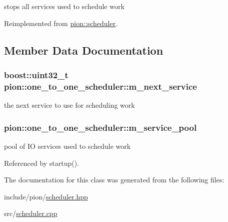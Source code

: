 stops all services used to schedule work 



Reimplemented from \hyperlink{classpion_1_1scheduler_a62b59f0561bd527d78768fd3a5ceeb36}{pion\-::scheduler}.



\subsection{Member Data Documentation}
\hypertarget{classpion_1_1one__to__one__scheduler_ae4e2b2a157c1c9e36694e86b6ae354b1}{
\subsubsection[{m\-\_\-next\-\_\-service}]{\setlength{\rightskip}{0pt plus 5cm}boost\-::uint32\-\_\-t pion\-::one\-\_\-to\-\_\-one\-\_\-scheduler\-::m\-\_\-next\-\_\-service\hspace{0.3cm}{\ttfamily [protected]}}}\label{classpion_1_1one__to__one__scheduler_ae4e2b2a157c1c9e36694e86b6ae354b1}


the next service to use for scheduling work 

\hypertarget{classpion_1_1one__to__one__scheduler_a8b6ae075086a579e46ca08a89085c07a}{
\subsubsection[{m\-\_\-service\-\_\-pool}]{ pion\-::one\-\_\-to\-\_\-one\-\_\-scheduler\-::m\-\_\-service\-\_\-pool\hspace{0.3cm}{\ttfamily [protected]}}}\label{classpion_1_1one__to__one__scheduler_a8b6ae075086a579e46ca08a89085c07a}


pool of I\-O services used to schedule work 



Referenced by startup().



The documentation for this class was generated from the following files\-:\begin{DoxyCompactItemize}
\item 
include/pion/\hyperlink{scheduler_8hpp}{scheduler.\-hpp}\item 
src/\hyperlink{scheduler_8cpp}{scheduler.\-cpp}\end{DoxyCompactItemize}

